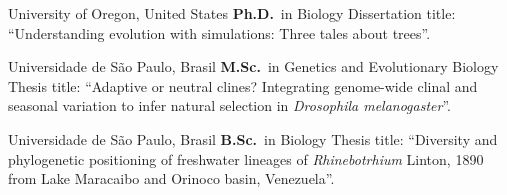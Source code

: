	{%
		University of Oregon, United States
    }
	{%
		\textbf{Ph.D.}~in Biology
    }
	{%
        Dissertation title: ``Understanding evolution with simulations: Three tales about trees''.
    }

		{%
			Universidade de São Paulo, Brasil
        }
		{%
			\textbf{M.Sc.}~in Genetics and Evolutionary Biology
        }
		{%
            Thesis title: ``Adaptive or neutral clines? Integrating genome-wide clinal and seasonal variation to infer natural selection in \textit{Drosophila melanogaster}''.
        }

		{%
			Universidade de São Paulo, Brasil
        }
		{%
			\textbf{B.Sc.}~in Biology
        }
		{%
		Thesis title: ``Diversity and phylogenetic positioning of freshwater lineages of \textit{Rhinebotrhium} Linton, 1890 from Lake Maracaibo and Orinoco basin, Venezuela''. 
        }
